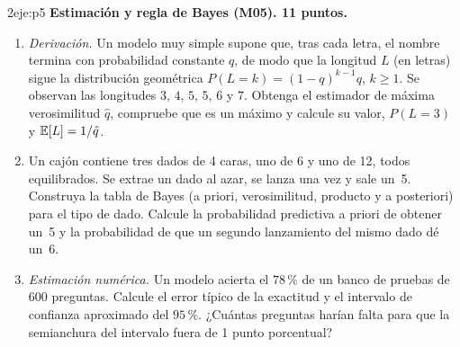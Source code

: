 \begin{ejercicio}{2}{eje:p5}
\textbf{Estimación y regla de Bayes (M05). 11 puntos.}
\begin{enumerate}[label=(\alph*)]
  \item {} \emph{Derivación.} Un modelo muy simple supone que, tras cada letra, el nombre termina con probabilidad constante $q$, de modo que la longitud $L$ (en letras) sigue la distribución geométrica $P(L=k)=(1-q)^{k-1}q$, $k\ge 1$. Se observan las longitudes $3$, $4$, $5$, $5$, $6$ y $7$. Obtenga el estimador de máxima verosimilitud $\hat q$, compruebe que es un máximo y calcule su valor, $P(L=3)$ y $\mathbb{E}[L]=1/\hat q$.
  \item {} Un cajón contiene tres dados de 4 caras, uno de 6 y uno de 12, todos equilibrados. Se extrae un dado al azar, se lanza una vez y sale un~5. Construya la tabla de Bayes (a priori, verosimilitud, producto y a posteriori) para el tipo de dado. Calcule la probabilidad predictiva a priori de obtener un~5 y la probabilidad de que un segundo lanzamiento del mismo dado dé un~6.
  \item {} \emph{Estimación numérica.} Un modelo acierta el $78\,\%$ de un banco de pruebas de $600$ preguntas. Calcule el error típico de la exactitud y el intervalo de confianza aproximado del $95\,\%$. ¿Cuántas preguntas harían falta para que la semianchura del intervalo fuera de 1 punto porcentual?
\end{enumerate}
\end{ejercicio}

